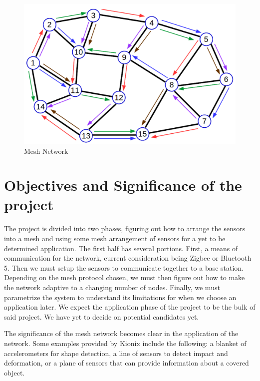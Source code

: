 \documentclass[11pt, a4paper]{article}
\begin{document}
 	\begin{figure}[!h]
	
	\begin{adjustwidth}{-1.5cm}{}
		\begin{center}
			\includegraphics[scale=0.90]{Images/mesh.png}
		\end{center}
	\end{adjustwidth}
	\caption{Mesh Network}
\end{figure}

\section{Objectives and Significance of the project} 

The project is divided into two phases, figuring out how to arrange the sensors into a mesh
and using some mesh arrangement of sensors for a yet to be determined application. The first half has
several portions. First, a means of communication for the network, current
consideration being Zigbee or Bluetooth 5. Then we must setup the sensors to communicate together to
a base station. Depending on the mesh protocol chosen, we must then figure out how to make the
network adaptive to a changing number of nodes. Finally, we must parametrize the system to
understand its limitations for when we choose an application later. We expect the application phase of
the project to be the bulk of said project. We have yet to decide on potential candidates yet.

The significance of the mesh network becomes clear in the application of the network. Some examples
provided by Kionix include the following: a blanket of accelerometers for shape detection, a line of
sensors to detect impact and deformation, or a plane of sensors that can provide information about a
covered object.
 
\end{document}
